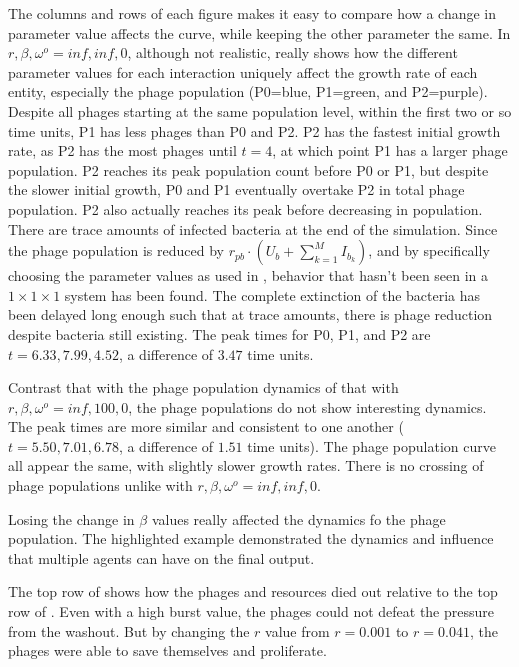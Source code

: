 The columns and rows of each figure makes it easy to compare how a change in parameter value affects the curve, while keeping the other parameter the same. 
In $r, \beta, \omega^o=inf, inf, 0$, although not realistic, really shows how the different parameter values for each interaction uniquely affect the growth rate of each entity, especially the phage population (P0=blue, P1=green, and P2=purple). 
Despite all phages starting at the same population level, within the first two or so time units, P1 has less phages than P0 and P2. 
P2 has the fastest initial growth rate, as P2 has the most phages until $t=4$, at which point P1 has a larger phage population. 
P2 reaches its peak population count before P0 or P1, but despite the slower initial growth, P0 and P1 eventually overtake P2 in total phage population. 
P2 also actually reaches its peak before decreasing in population. 
There are trace amounts of infected bacteria at the end of the simulation. 
Since the phage population is reduced by $r_{pb}\cdot(U_b + \sum_{k=1}^M I_{b_k})$, and by specifically choosing the parameter values as used in , behavior that hasn't been seen in a $1\times 1\times 1$ system has been found. 
The complete extinction of the bacteria has been delayed long enough such that at trace amounts, there is phage reduction despite bacteria still existing. 
The peak times for P0, P1, and P2 are $t=6.33, 7.99, 4.52$, a difference of $3.47$ time units. 

Contrast that with the phage population dynamics of that with $r, \beta, \omega^o = inf, 100, 0$, the phage populations do not show interesting dynamics. 
The peak times are more similar and consistent to one another ($t=5.50, 7.01, 6.78$, a difference of $1.51$ time units). 
The phage population curve all appear the same, with slightly slower growth rates. 
There is no crossing of phage populations unlike with $r, \beta, \omega^o=inf, inf, 0$. 

Losing the change in $\beta$ values really affected the dynamics fo the phage population. 
The highlighted example demonstrated the dynamics and influence that multiple agents can have on the final output. 

The top row of  shows how the phages and resources died out relative to the top row of . 
Even with a high burst value, the phages could not defeat the pressure from the washout. 
But by changing the $r$ value from $r=0.001$ to $r=0.041$, the phages were able to save themselves and proliferate. 


